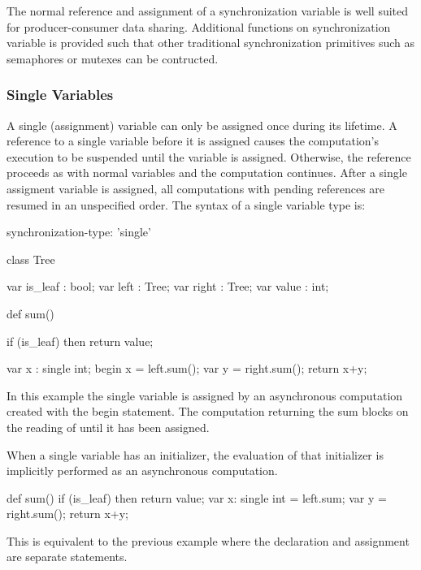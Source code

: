 The normal reference and assignment of a synchronization variable is
well suited for producer-consumer data sharing. Additional functions
on synchronization variable is provided such that other traditional
synchronization primitives such as semaphores or mutexes can be
contructed.


\subsubsection{Single Variables}
\label{Single_Variables}

A single (assignment) variable can only be assigned once during its
lifetime.  A reference to a single variable before
it is assigned causes the computation's execution to be suspended
until the variable is assigned. Otherwise, the reference proceeds as
with normal variables and the computation continues.  After a single
assigment variable is assigned, all computations with pending
references are resumed in an unspecified order. The syntax of a single
variable type is:
\begin{syntax}
 synchronization-type:
   'single'
\end{syntax}

\begin{example}
\begin{chapel}
class Tree {
  var is_leaf : bool;
  var left    : Tree;
  var right   : Tree;
  var value   : int;

  def sum() {
    if (is_leaf) then 
       return value;

    var x : single int;
    begin x = left.sum();
    var y = right.sum();
    return x+y;
  }
}

\end{chapel}
In this example the single variable  is assigned by an
asynchronous computation created with the begin statement. The
computation returning the sum blocks on the reading of  until
it has been assigned.


\end{example}

When a single variable has an initializer, the evaluation of
that initializer is implicitly performed as an asynchronous computation. 
\begin{example}
\begin{chapel}
def sum() {
  if (is_leaf) then 
     return value;
  var x: single int = left.sum;
  var y = right.sum();
  return x+y;
}
\end{chapel}
This is equivalent to the previous example where the declaration and
assignment are separate statements.
\end{example}


